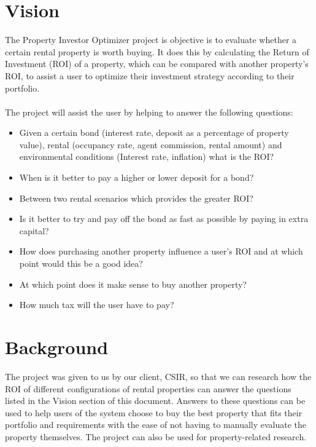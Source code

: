 \documentclass[a4paper,12pt]{article}
\begin{document}
\section{Vision}
The Property Investor Optimizer project is objective is to evaluate whether a certain rental property is worth buying. It does this by calculating the Return of Investment (ROI) of a property, which can be compared with another property's ROI, to assist a user to optimize their investment strategy according to their portfolio.\\\\
The project will assist the user by helping to answer the following questions:\begin{itemize}
	\item Given a certain bond (interest rate, deposit as a percentage of property value), rental (occupancy rate, agent commission, rental amount) and environmental conditions (Interest rate, inflation) what is the ROI?
	\item When is it better to pay a higher or lower deposit for a bond?
	\item Between two rental scenarios which provides the greater ROI?
	\item Is it better to try and pay off the bond as fast as possible by paying in extra capital?
	\item How does purchasing another property influence a user's ROI and at which point would this be a good idea?
	\item At which point does it make sense to buy another property?
	\item How much tax will the user have to pay?

\end{itemize}
\newpage
\section{Background}
The project was given to us by our client, CSIR, so that we can research how the ROI of different configurations of rental properties can answer the questions listed in the Vision section of this document. Answers to these questions can be used to help users of the system choose to buy the best property that fits their portfolio and requirements with the ease of not having to manually evaluate the property themselves. The project can also be used for property-related research.

\end{document}
